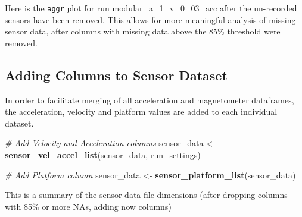 \documentclass[]{article}
\newenvironment{Shaded}{\begin{snugshade}}{\end{snugshade}}
\newcommand{\CommentTok}[1]{\textcolor[rgb]{0.56,0.35,0.01}{\textit{#1}}}
\newcommand{\KeywordTok}[1]{\textcolor[rgb]{0.13,0.29,0.53}{\textbf{#1}}}
\newcommand{\NormalTok}[1]{#1}
\newcommand{\StringTok}[1]{\textcolor[rgb]{0.31,0.60,0.02}{#1}}
\begin{document}
Here is the \texttt{aggr} plot for run modular\_a\_1\_v\_0\_03\_acc
after the un-recorded sensors have been removed. This allows for more
meaningful analysis of missing sensor data, after columns with missing
data above the 85\% threshold were removed.

\newpage

\hypertarget{adding-columns-to-sensor-dataset}{%
\subsection{Adding Columns to Sensor
Dataset}\label{adding-columns-to-sensor-dataset}}

In order to facilitate merging of all acceleration and magnetometer
dataframes, the acceleration, velocity and platform values are added to
each individual dataset.

\begin{Shaded}
\begin{Highlighting}[]
\CommentTok{# Add Velocity and Acceleration columns}
\NormalTok{sensor_data <-}\StringTok{ }\KeywordTok{sensor_vel_accel_list}\NormalTok{(sensor_data, run_settings)}

\CommentTok{# Add Platform column}
\NormalTok{sensor_data <-}\StringTok{ }\KeywordTok{sensor_platform_list}\NormalTok{(sensor_data)}
\end{Highlighting}
\end{Shaded}

This is a summary of the sensor data file dimensions (after dropping
columns with 85\% or more NAs, adding now columns)
\end{document}
